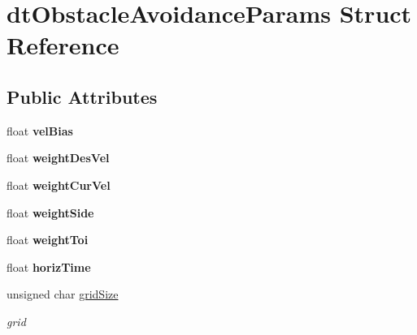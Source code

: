 \hypertarget{structdtObstacleAvoidanceParams}{}\section{dt\+Obstacle\+Avoidance\+Params Struct Reference}
\label{structdtObstacleAvoidanceParams}
\subsection*{Public Attributes}
\begin{DoxyCompactItemize}
\item 
\mbox{\label{structdtObstacleAvoidanceParams_aa0f2c37d4f28a77a68df51efa53f10c8}} 
float {\bfseries vel\+Bias}
\item 
\mbox{\label{structdtObstacleAvoidanceParams_a5d409ac4b0ab128139caf586f130d079}} 
float {\bfseries weight\+Des\+Vel}
\item 
\mbox{\label{structdtObstacleAvoidanceParams_af7ec3edc6cae60dd41cc8df169b3ae63}} 
float {\bfseries weight\+Cur\+Vel}
\item 
\mbox{\label{structdtObstacleAvoidanceParams_a310499f03a1697ab7c32db9565bf8329}} 
float {\bfseries weight\+Side}
\item 
\mbox{\label{structdtObstacleAvoidanceParams_a7cfb9d5a8b8a3358e95755bd81811c26}} 
float {\bfseries weight\+Toi}
\item 
\mbox{\label{structdtObstacleAvoidanceParams_a20bba3a481f4478eb32fce9a7f61c436}} 
float {\bfseries horiz\+Time}
\item 
\mbox{\label{structdtObstacleAvoidanceParams_a38655cab9f879095f3f0906fdf535f3c}} 
unsigned char \hyperlink{structdtObstacleAvoidanceParams_a38655cab9f879095f3f0906fdf535f3c}{grid\+Size}
\begin{DoxyCompactList}\small\item\em grid \end{DoxyCompactList}\item 

\end{DoxyCompactItemize}
